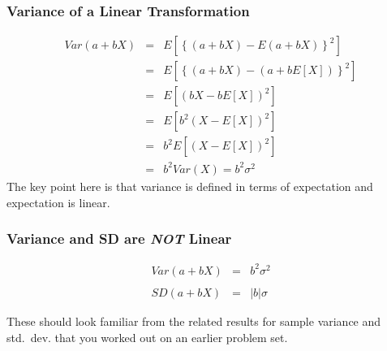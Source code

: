 %
\begin{frame}
\frametitle{Variance of a Linear Transformation}

\begin{eqnarray*}
 Var(a + bX) &=& E\left[\left\{(a+bX) - E(a+bX)\right\}^2 \right] \\ 
 	&=& E\left[\left\{(a+bX) - (a+bE[X])\right\}^2 \right] \\
 	&=&E\left[\left(bX - bE[X]\right)^2 \right] \\ 
 	&=&E[b^2 (X - E[X])^2]\\ 
 	&=& b^2 E[(X-E[X])^2]\\ 
 	&=& b^2 Var(X) = b^2 \sigma^2
\end{eqnarray*}
\alert{The key point here is that variance is defined in terms of expectation and expectation is linear.}

\end{frame}
\begin{frame}
	\frametitle{Variance and SD are \emph{NOT} Linear}

\begin{eqnarray*}
Var(a + bX) &= &b^2 \sigma^2 \\\\
	SD(a + bX)&=& |b| \sigma
\end{eqnarray*}

\vspace{2em}
\begin{block}{These should look familiar from the related results for sample variance and std.\ dev. that you worked out on an earlier problem set.}

\end{block}

\end{frame}
